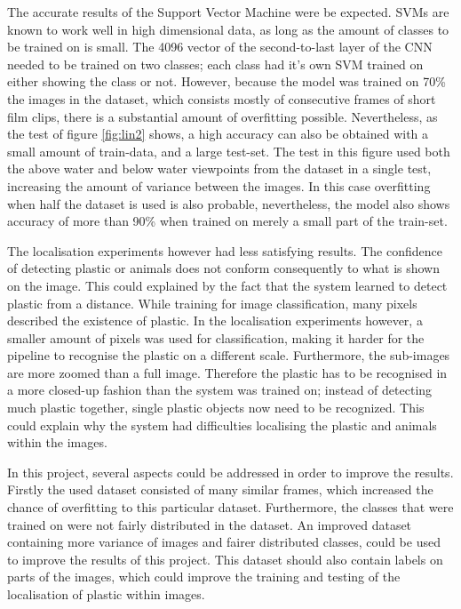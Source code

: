 The accurate results of the Support Vector Machine were be expected.
SVMs are known to work well in high dimensional data, as long as the amount of classes to be trained on is small.
The 4096 vector of the second-to-last layer of the CNN needed to be trained on two classes; each class had it's own SVM trained on either showing the class or not.
However, because the model was trained on 70\% the images in the dataset, which consists mostly of consecutive frames of short film clips, there is a substantial amount of overfitting possible.
Nevertheless, as the test of figure \ref{fig:lin2} shows, a high accuracy can also be obtained with a small amount of train-data, and a large test-set.
The test in this figure used both the above water and below water viewpoints from the dataset in a single test, increasing the amount of variance between the images.
In this case overfitting when half the dataset is used is also probable, nevertheless, the model also shows accuracy of more than 90\% when trained on merely a small part of the train-set.

The localisation experiments however had less satisfying results.
The confidence of detecting plastic or animals does not conform consequently to what is shown on the image.
This could explained by the fact that the system learned to detect plastic from a distance.
While training for image classification, many pixels described the existence of plastic. In the localisation experiments however, a smaller amount of pixels was used for classification, making it harder for the pipeline to recognise the plastic on a different scale.
Furthermore, the sub-images are more zoomed than a full image.
Therefore the plastic has to be recognised in a more closed-up fashion than the system was trained on; instead of detecting much plastic together, single plastic objects now need to be recognized.
This could explain why the system had difficulties localising the plastic and animals within the images.

In this project, several aspects could be addressed in order to improve the results.
Firstly the used dataset consisted of many similar frames, which increased the chance of overfitting to this particular dataset.
Furthermore, the classes that were trained on were not fairly distributed in the dataset.
An improved dataset containing more variance of images and fairer distributed classes, could be used to improve the results of this project.
This dataset should also contain labels on parts of the images, which could improve the training and testing of the localisation of plastic within images.


